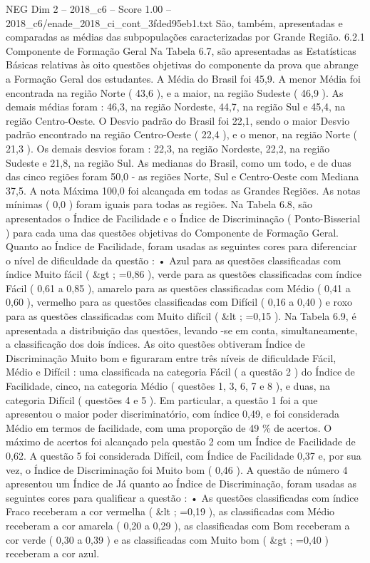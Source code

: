 \begin{textsample}{NEG Dim 2 – 2018\_c6 – Score 1.00 – 2018\_c6/enade\_2018\_ci\_cont\_3fded95eb1.txt}
São, também, apresentadas e comparadas as médias das subpopulações caracterizadas por Grande Região. 6.2.1 Componente de Formação Geral Na Tabela 6.7, são apresentadas as Estatísticas Básicas relativas às oito questões objetivas do componente da prova que abrange a Formação Geral dos estudantes.
A Média do Brasil foi 45,9.
A menor Média foi encontrada na região Norte ( 43,6 ), e a maior, na região Sudeste ( 46,9 ).
As demais médias foram : 46,3, na região Nordeste, 44,7, na região Sul e 45,4, na região Centro-Oeste.
O Desvio padrão do Brasil foi 22,1, sendo o maior Desvio padrão encontrado na região Centro-Oeste ( 22,4 ), e o menor, na região Norte ( 21,3 ).
Os demais desvios foram : 22,3, na região Nordeste, 22,2, na região Sudeste e 21,8, na região Sul.
As medianas do Brasil, como um todo, e de duas das cinco regiões foram 50,0 - as regiões Norte, Sul e Centro-Oeste com Mediana 37,5.
A nota Máxima 100,0 foi alcançada em todas as Grandes Regiões.
As notas mínimas ( 0,0 ) foram iguais para todas as regiões.
Na Tabela 6.8, são apresentados o Índice de Facilidade e o Índice de Discriminação ( Ponto-Bisserial ) para cada uma das questões objetivas do Componente de Formação Geral.
Quanto ao Índice de Facilidade, foram usadas as seguintes cores para diferenciar o nível de dificuldade da questão : • Azul para as questões classificadas com índice Muito fácil ( \&gt ; =0,86 ), verde para as questões classificadas com índice Fácil ( 0,61 a 0,85 ), amarelo para as questões classificadas com Médio ( 0,41 a 0,60 ), vermelho para as questões classificadas com Difícil ( 0,16 a 0,40 ) e roxo para as questões classificadas com Muito difícil ( \&lt ; =0,15 ).
Na Tabela 6.9, é apresentada a distribuição das questões, levando -se em conta, simultaneamente, a classificação dos dois índices.
As oito questões obtiveram Índice de Discriminação Muito bom e figuraram entre três níveis de dificuldade Fácil, Médio e Difícil : uma classificada na categoria Fácil ( a questão 2 ) do Índice de Facilidade, cinco, na categoria Médio ( questões 1, 3, 6, 7 e 8 ), e duas, na categoria Difícil ( questões 4 e 5 ).
Em particular, a questão 1 foi a que apresentou o maior poder discriminatório, com índice 0,49, e foi considerada Médio em termos de facilidade, com uma proporção de 49 \% de acertos.
O máximo de acertos foi alcançado pela questão 2 com um Índice de Facilidade de 0,62.
A questão 5 foi considerada Difícil, com Índice de Facilidade 0,37 e, por sua vez, o Índice de Discriminação foi Muito bom ( 0,46 ).
A questão de número 4 apresentou um Índice de Já quanto ao Índice de Discriminação, foram usadas as seguintes cores para qualificar a questão : • As questões classificadas com índice Fraco receberam a cor vermelha ( \&lt ; =0,19 ), as classificadas com Médio receberam a cor amarela ( 0,20 a 0,29 ), as classificadas com Bom receberam a cor verde ( 0,30 a 0,39 ) e as classificadas com Muito bom ( \&gt ; =0,40 ) receberam a cor azul.

\end{textsample}
